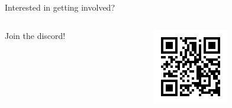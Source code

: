 \documentclass{beamer}
\begin{document}
\begin{frame}{Interested in getting involved?}
  \begin{columns}
    \begin{column}{0.5\textwidth}
      \centering
      Join the discord!
    \end{column}
    \begin{column}{0.3\textwidth}
      \centering
      \includegraphics[width=\textwidth]{assets/join-discord-qr.png}
    \end{column}
  \end{columns}
\end{frame}
\end{document}
